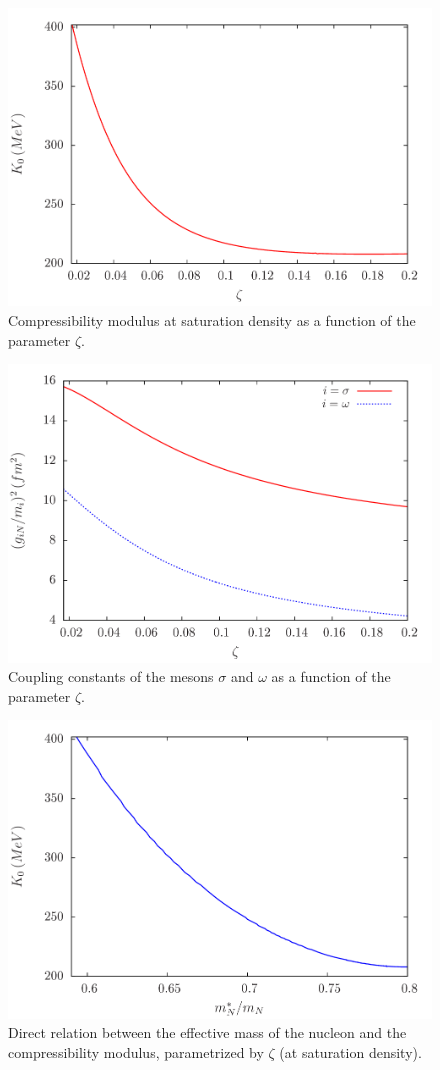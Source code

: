 \documentclass[twocolumn,showpacs,aps]{revtex4}
\begin{document}
  \begin{figure}
 \centering
 \vspace{1.0cm}
 \includegraphics[width=9.cm]{K0_lambda.png}
 \caption{\label{K0lambda} Compressibility modulus at saturation density as a function of the parameter $\zeta$.}
 \end{figure}
 
 \begin{figure}
 \centering
 \vspace{1.0cm}
 \includegraphics[width=9.cm]{coupling_sw_lambda.png}
 \caption{\label{coupling_sw_lambda} Coupling constants of the mesons $\sigma$ and $\omega$ as a function of the parameter $\zeta$.}
 \end{figure}

   \begin{figure}
 \centering
 \vspace{1.0cm}
 \includegraphics[width=9.cm]{meff_K0.png}
 \caption{\label{meffK0} Direct relation between the effective mass of the nucleon and the compressibility modulus, 
 parametrized by $\zeta$ (at saturation density).}
 \end{figure}
 
\end{document}
